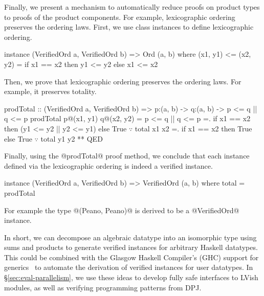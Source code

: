 Finally, we present a mechanism to automatically
reduce proofs on product types to proofs of the product components.
%
For example, lexicographic ordering preserves the ordering laws.
%
First, we use class instances to define lexicographic ordering.
%
\begin{mcode}
  instance (VerifiedOrd a, VerifiedOrd b) => Ord (a, b) where
    (x1, y1) <= (x2, y2) = if x1 == x2 then y1 <= y2 else x1 <= x2
\end{mcode}
%
Then, we prove that lexicographic ordering
preserves the ordering laws.
%
For example, it preserves totality.
%
\begin{mcode}
  prodTotal :: (VerifiedOrd a, VerifiedOrd b)
            => p:(a, b) -> q:(a, b) -> {p <= q || q <= p}
  prodTotal p@(x1, y1) q@(x2, y2)
   =  p <= q || q <= p
   =. if x1 == x2 then (y1 <= y2 || y2 <= y1) else True 
      $\because$ total x1 x2
   =. if x1 == x2 then True                   else True 
      $\because$ total y1 y2
   ** QED
\end{mcode}
%
Finally, using the @prodTotal@ proof method,
we conclude that each instance defined via the lexicographic
ordering is indeed a verified instance.
%
\begin{mcode}
  instance (VerifiedOrd a, VerifiedOrd b) => VerifiedOrd (a, b) where
    total   = prodTotal
\end{mcode}
%
For example the type @(Peano, Peano)@ is derived to be a @VerifiedOrd@ instance.

In short, we can decompose an algebraic datatype into an isomorphic type using sums and
products to generate verified instances for arbitrary Haskell
datatypes. This could be combined with the Glasgow Haskell Compiler's (GHC) support
for generics~\cite{ghc-generics} to automate the derivation of verified instances
for user datatypes.
In \S\ref{sec:eval-parallelism}, we use these ideas to develop fully safe
interfaces to LVish modules, as well as verifying programming patterns from DPJ.

